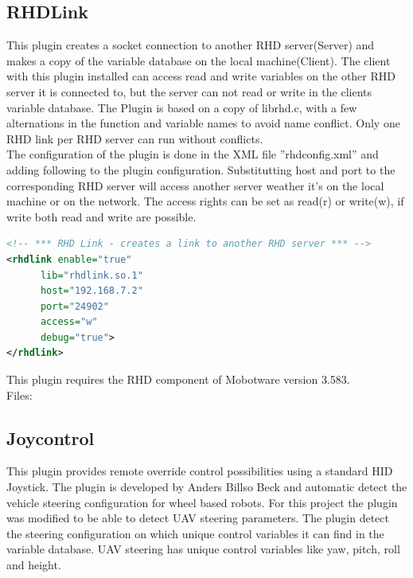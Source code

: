 \subsection{RHDLink}
This plugin creates a socket connection to another RHD server(Server) and makes a copy of the variable database on the local machine(Client). The client with this plugin installed can access read and write variables on the other RHD server it is connected to, but the server can not read or write in the clients variable database. 
The Plugin is based on a copy of librhd.c, with a few alternations in the function and variable names to avoid name conflict. Only one RHD link per RHD server can run without conflicts. \\

\noindent
The configuration of the plugin is done in the XML file ''rhdconfig.xml'' and adding following to the plugin configuration. Substitutting host and port to the corresponding RHD server will access another server weather it's on the local machine or on the network.
The access rights can be set as read(r) or write(w), if write both read and write are possible.
\begin{lstlisting}[language=XML]
<!-- *** RHD Link - creates a link to another RHD server *** -->
<rhdlink enable="true"
	  lib="rhdlink.so.1"
      host="192.168.7.2"
      port="24902"
      access="w"
      debug="true">
</rhdlink>
\end{lstlisting}

\noindent
This plugin requires the RHD component of Mobotware version 3.583.\\

\noindent
Files:


\subsection{Joycontrol}
This plugin provides remote override control possibilities using a standard HID Joystick. The plugin is developed by Anders Billso Beck and automatic detect the vehicle steering configuration for wheel based robots. For this project the plugin was modified to be able to detect UAV steering parameters. The plugin detect the steering configuration on which unique control variables it can find in the variable database. UAV steering has unique control variables like yaw, pitch, roll and height.


